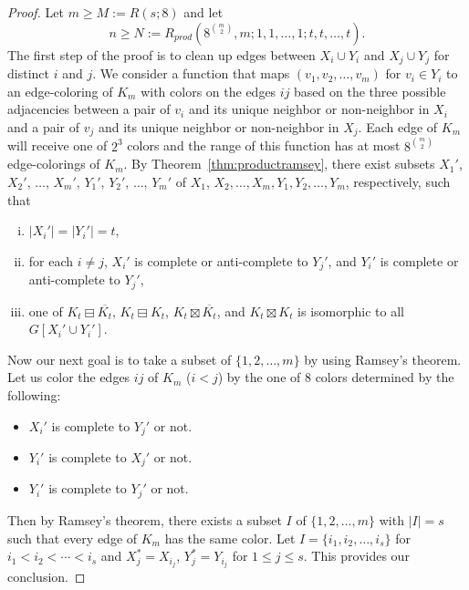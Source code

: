 \documentclass[11pt]{article}
\newcommand\abs[1]{\lvert #1\rvert}
\newcommand\mat{\boxminus}
\newcommand\antimat{\boxtimes}
\def\S_#1{\overline{K_{#1}}}
\begin{document}
\begin{proof}
  Let $m\ge M:=R(s;8)$ and  
  let  \[n\ge N:=R_{prod} (8^{\binom{m}{2}}, m; 1, 1, \ldots, 1; t,t,\ldots,t).\]
  The first step of the proof is to clean up edges between $X_i\cup Y_i$ and
  $X_j\cup Y_j$ for distinct $i$ and $j$.
  We consider a function that maps $(v_1,v_2,\ldots,v_m)$ for $v_i\in Y_i$
  to an edge-coloring
  of $K_m$ with colors on the edges $ij$
  based on the three possible adjacencies between
  a pair of $v_i$ and its unique neighbor or non-neighbor in $X_i$
  and a pair of $v_j$ and its unique neighbor or non-neighbor in $X_j$.
  Each edge of $K_m$ will receive one of $2^3$ colors and
  the range of this function has at most $8^{\binom{m}{2}}$ edge-colorings of $K_m$.
  By Theorem~\ref{thm:productramsey},
  there exist subsets $X_1'$, $X_2'$, $\ldots$, $ X_m'$, $Y_1'$, $Y_2'$, $\ldots$,  $Y_m'$ of
  $X_1$, $X_2,\ldots, X_m,Y_1,Y_2,\ldots,  Y_m$, respectively, such that
  \begin{enumerate}[(i)]
  \item $\abs{X_i'}=\abs{Y_i'}=t$,
  \item for each $i\neq j$, $X_i'$ is complete or anti-complete to $Y_j'$, and 
    $Y_i'$ is complete or anti-complete to $Y_j'$,
  \item 
    one of 
    $K_{t}\mat \S_{t}$,
    $K_{t}\mat K_{t}$,  $K_{t}\antimat \S_{t}$, 
    and $K_{t}\antimat K_{t}$
    is isomorphic to all $G[X_i'\cup Y_i']$.
  \end{enumerate}

  Now our next goal is to take a subset of $\{1,2,\ldots,m\}$ by using Ramsey's theorem.
  Let us color the edges $ij$ of $K_{m}$ ($i<j$) by the one of $8$ colors
  determined by the following:
  \begin{itemize}
  \item $X_i'$ is complete to $Y_j'$ or not.
  \item $Y_i'$ is complete to $X_j'$ or not.
  \item $Y_i'$ is complete to $Y_j'$ or not.
  \end{itemize}
  Then by Ramsey's theorem, there exists a subset $I$ of $\{1,2,\ldots,m\}$
  with $\abs{I}= s$  
  such that every edge of $K_m$ has the same color.
  Let $I=\{i_1,i_2,\ldots,i_s\}$ for $i_1<i_2<\cdots<i_s$
  and $X_j^*=X_{i_j}$, $Y_j^*=Y_{i_j}$ for $1\le j\le s$. This provides our conclusion.
\end{proof}
\end{document}
